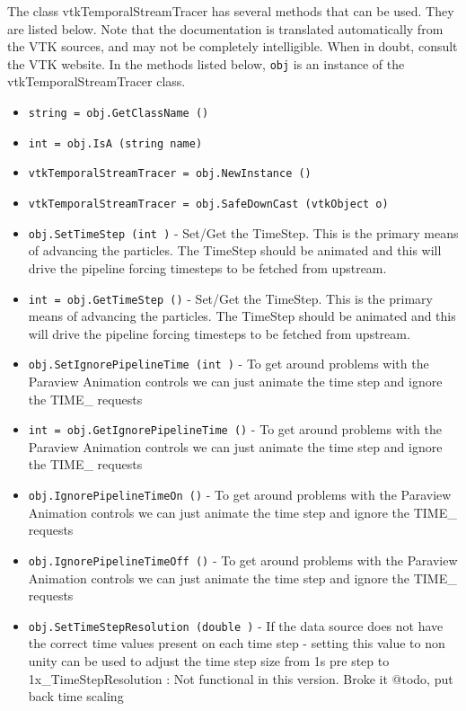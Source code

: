 The class vtkTemporalStreamTracer has several methods that can be used.
  They are listed below.
Note that the documentation is translated automatically from the VTK sources,
and may not be completely intelligible.  When in doubt, consult the VTK website.
In the methods listed below, \verb|obj| is an instance of the vtkTemporalStreamTracer class.
\begin{itemize}
\item  \verb|string = obj.GetClassName ()|

\item  \verb|int = obj.IsA (string name)|

\item  \verb|vtkTemporalStreamTracer = obj.NewInstance ()|

\item  \verb|vtkTemporalStreamTracer = obj.SafeDownCast (vtkObject o)|

\item  \verb|obj.SetTimeStep (int )| -  Set/Get the TimeStep. This is the primary means of advancing 
 the particles. The TimeStep should be animated and this will drive
 the pipeline forcing timesteps to be fetched from upstream.

\item  \verb|int = obj.GetTimeStep ()| -  Set/Get the TimeStep. This is the primary means of advancing 
 the particles. The TimeStep should be animated and this will drive
 the pipeline forcing timesteps to be fetched from upstream.

\item  \verb|obj.SetIgnorePipelineTime (int )| -  To get around problems with the Paraview Animation controls
 we can just animate the time step and ignore the TIME\_ requests

\item  \verb|int = obj.GetIgnorePipelineTime ()| -  To get around problems with the Paraview Animation controls
 we can just animate the time step and ignore the TIME\_ requests

\item  \verb|obj.IgnorePipelineTimeOn ()| -  To get around problems with the Paraview Animation controls
 we can just animate the time step and ignore the TIME\_ requests

\item  \verb|obj.IgnorePipelineTimeOff ()| -  To get around problems with the Paraview Animation controls
 we can just animate the time step and ignore the TIME\_ requests

\item  \verb|obj.SetTimeStepResolution (double )| -  If the data source does not have the correct time values 
 present on each time step - setting this value to non unity can
 be used to adjust the time step size from 1s pre step to
 1x\_TimeStepResolution : Not functional in this version. 
 Broke it @todo, put back time scaling


\end{itemize}
